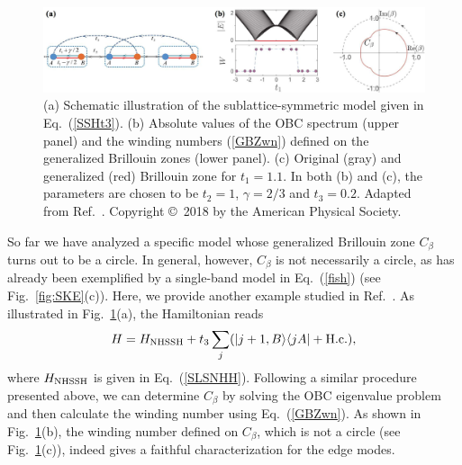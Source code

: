 \documentclass{tADP2e}
\theoremstyle{plain}
\theoremstyle{plain}
\theoremstyle{definition}
\begin{document}
\begin{figure}[!t]
\begin{center}
\includegraphics[width=12cm]{./Figures/fig_5_GBZ.pdf}
\end{center}
\caption{(a) Schematic illustration of the sublattice-symmetric model given in Eq.~(\ref{SSHt3}). (b) Absolute values of the OBC spectrum (upper panel) and the winding numbers (\ref{GBZwn}) defined on the generalized Brillouin zones (lower panel). (c) Original (gray) and generalized (red) Brillouin zone for $t_1=1.1$. In both (b) and (c), the parameters are chosen to be $t_2=1$, $\gamma=2/3$ and $t_3=0.2$. Adapted from Ref.~\cite{YS18a}. Copyright \copyright\,  2018 by the American Physical Society.}
\label{fig:GBZ}
\end{figure}



So far we have analyzed a specific model whose generalized Brillouin zone $C_\beta$  turns out to be a circle. In general, however, $C_\beta$ is not necessarily a circle, as has already been exemplified by a single-band model in Eq.~(\ref{fish}) (see Fig.~\ref{fig:SKE}(c)). Here, we provide another example studied in Ref.~\cite{YS18a}. As illustrated in Fig.~\ref{fig:GBZ}(a), the Hamiltonian reads
\begin{equation}
H=H_{\rm NHSSH}+t_3\sum_j(|j+1,B\rangle\langle jA|+{\rm H.c.}),
\label{SSHt3}
\end{equation}
where $H_{\rm NHSSH}$ is given  
in Eq.~(\ref{SLSNHH}). Following a similar procedure presented above, we can determine $C_\beta$ 
by solving the OBC eigenvalue problem and then calculate the winding number using Eq.~(\ref{GBZwn}). As  shown in Fig.~\ref{fig:GBZ}(b), the winding number defined on $C_\beta$,  
which is not a circle (see Fig.~\ref{fig:GBZ}(c)), indeed gives a faithful characterization for the edge modes. 
\end{document}
